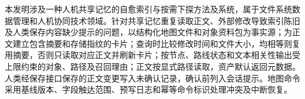 
本发明涉及一种人机共享记忆的自愈索引与按需下探方法及系统，属于文件系统数据管理和人机协同技术领域。针对共享记忆重复读取正文、外部修改导致索引陈旧及人类保存内容缺少提示的问题，以结构化地图文件和对象资料包为事实源；为正文建立包含摘要和存储指纹的卡片；查询时比较修改时间和文件大小，均相等则复用摘要，否则只读取对应正文并刷新卡片；按节点、路线状态和文本相关性输出受上限约束的对象、路径及召回理由；正文按显式路径读取，资产默认返回元数据。人类经保存接口保存的正文变更写入未确认记录，确认前列入会话提示。地图命令采用基线版本、字段触达范围、预写日志和幂等命令标识处理冲突及中断恢复。

\vspace{0.65em}
\noindent{}\par
\vspace{0.35em}
\noindent\makebox[\textwidth][c]{\resizebox{0.68\textwidth}{!}{}}\par
\vspace{0.3em}
\noindent{}\par

